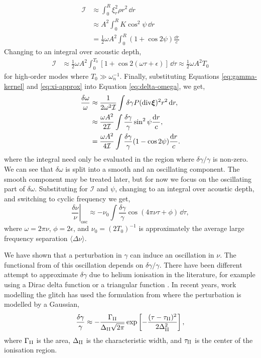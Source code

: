 \begin{align}
    \mathcal{I} &\approx \int_0^R \xi_r^2 \rho r^2 \, \dd r\\
    &\approx A^2 \int_0^R K \cos^2\psi \, \dd r\\
    &= \frac12 \omega A^2 \int_0^R (1 + \cos 2 \psi) \frac{\dd r}{c}
\end{align}
%
Changing to an integral over acoustic depth,
%
\begin{align}
    \mathcal{I} &\approx \frac12 \omega A^2 \int_0^{T_0} [1 + \cos 2 (\omega\tau + \epsilon)] \, \dd \tau \approx \frac12 \omega A^2 T_0
\end{align}
%
for high-order modes where \(T_0 \gg \omega_n^{-1}\). Finally, substituting Equations \ref{eq:gamma-kernel} and \ref{eq:xi-approx} into Equation \ref{eq:delta-omega}, we get,
%
\begin{align}
    \frac{\delta\omega}{\omega} &\approx \frac{1}{2\omega^2\mathcal{I}} \int \delta\gamma P (\mathrm{div} \bm{\xi})^2 r^2 \, \mathrm{d} r,\\
    &\approx \frac{\omega A^2}{2 \mathcal{I}} \int \frac{\delta\gamma}{\gamma}\sin^2\psi\frac{\mathrm{d} r}{c},\\
    &= \frac{\omega A^2}{4 \mathcal{I}} \int \frac{\delta\gamma}{\gamma}(1 - \cos 2\psi)\frac{\mathrm{d} r}{c}.
\end{align}
%
where the integral need only be evaluated in the region where \(\delta\gamma / \gamma\) is non-zero. We can see that \(\delta\omega\) is split into a smooth and an oscillating component. The smooth component may be treated later, but for now we focus on the oscillating part of \(\delta\omega\). Substituting for \(\mathcal{I}\) and \(\psi\), changing to an integral over acoustic depth, and switching to cyclic frequency we get,
%
\begin{equation}
    \left.\frac{\delta\nu}{\nu}\right|_\mathrm{osc} \approx - \nu_0 \int \frac{\delta\gamma}{\gamma} \cos (4 \pi\nu\tau + \phi) \, \dd \tau,
\end{equation}
%
where \(\omega = 2\pi\nu\), \(\phi = 2\epsilon\), and \(\nu_0 = (2 T_0)^{-1}\) is approximately the average large frequency separation \(\langle \Delta \nu \rangle\).

We have shown that a perturbation in \(\gamma\) can induce an oscillation in \(\nu\). The functional from of this oscillation depends on \(\delta\gamma/\gamma\). There have been different attempt to approximate \(\delta\gamma\) due to helium ionisation in the literature, for example using a Dirac delta function or a triangular function \citep{Monteiro.Christensen-Dalsgaard.ea1994, Monteiro.Thompson2005}. In recent years, work modelling the glitch has used the formulation from \citet{Houdek.Gough2007} where the perturbation is modelled by a Gaussian,
%
\begin{equation}
    \frac{\delta\gamma}{\gamma} \approx - \frac{\Gamma_{{\mathrm{II}}}}{\Delta_{{\mathrm{II}}} \sqrt{2\pi}} \exp\left[ - \frac{(\tau - \tau_{{\mathrm{II}}})^2}{2\Delta_{{\mathrm{II}}}^2} \right],
\end{equation}
%
where \(\Gamma_{{\mathrm{II}}}\) is the area, \(\Delta_{{\mathrm{II}}}\) is the characteristic width, and \(\tau_{{\mathrm{II}}}\) is the center of the ionisation region.

